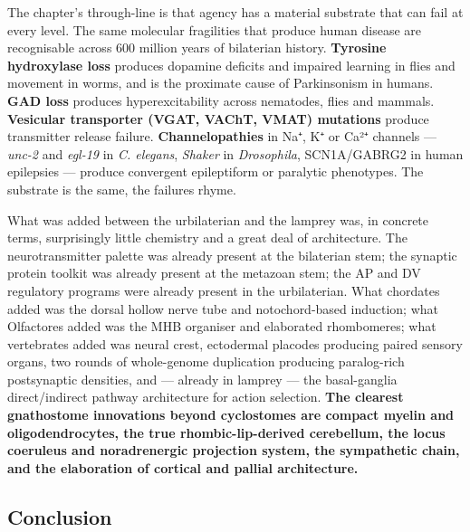 The chapter's through-line is that agency has a material substrate that can fail at every level. The same molecular fragilities that produce human disease are recognisable across 600 million years of bilaterian history. \textbf{Tyrosine hydroxylase loss} produces dopamine deficits and impaired learning in flies and movement in worms, and is the proximate cause of Parkinsonism in humans. \textbf{GAD loss} produces hyperexcitability across nematodes, flies and mammals. \textbf{Vesicular transporter (VGAT, VAChT, VMAT) mutations} produce transmitter release failure. \textbf{Channelopathies} in Na⁺, K⁺ or Ca²⁺ channels --- \emph{unc-2} and \emph{egl-19} in \emph{C. elegans}, \emph{Shaker} in \emph{Drosophila}, SCN1A/GABRG2 in human epilepsies --- produce convergent epileptiform or paralytic phenotypes. The substrate is the same, the failures rhyme.

What was added between the urbilaterian and the lamprey was, in concrete terms, surprisingly little chemistry and a great deal of architecture. The neurotransmitter palette was already present at the bilaterian stem; the synaptic protein toolkit was already present at the metazoan stem; the AP and DV regulatory programs were already present in the urbilaterian. What chordates added was the dorsal hollow nerve tube and notochord-based induction; what Olfactores added was the MHB organiser and elaborated rhombomeres; what vertebrates added was neural crest, ectodermal placodes producing paired sensory organs, two rounds of whole-genome duplication producing paralog-rich postsynaptic densities, and --- already in lamprey --- the basal-ganglia direct/indirect pathway architecture for action selection. \textbf{The clearest gnathostome innovations beyond cyclostomes are compact myelin and oligodendrocytes, the true rhombic-lip-derived cerebellum, the locus coeruleus and noradrenergic projection system, the sympathetic chain, and the elaboration of cortical and pallial architecture.}

\subsection{Conclusion}\label{04_urbilateria-conclusion}

